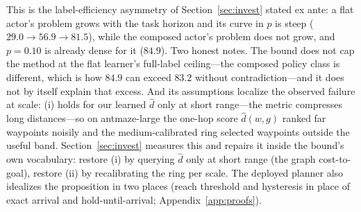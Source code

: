 \documentclass{article}
\theoremstyle{plain}
\theoremstyle{definition}
\begin{document}
This is the label-efficiency asymmetry of Section~\ref{sec:invest} stated ex ante: a flat actor's problem grows with the task horizon and its curve in $p$ is steep ($29.0\rightarrow56.9\rightarrow81.5$), while the composed actor's problem does not grow, and $p{=}0.10$ is already dense for it ($84.9$). Two honest notes. The bound does not cap the method at the flat learner's full-label ceiling---the composed policy class is different, which is how $84.9$ can exceed $83.2$ without contradiction---and it does not by itself explain that excess. And its assumptions localize the observed failure at scale: (i) holds for our learned $\hat d$ only at short range---the metric compresses long distances---so on antmaze-large the one-hop score $\hat d(w,g)$ ranked far waypoints noisily and the medium-calibrated ring selected waypoints outside the useful band. Section~\ref{sec:invest} measures this and repairs it inside the bound's own vocabulary: restore (i) by querying $\hat d$ only at short range (the graph cost-to-goal), restore (ii) by recalibrating the ring per scale. The deployed planner also idealizes the proposition in two places (reach threshold and hysteresis in place of exact arrival and hold-until-arrival; Appendix~\ref{app:proofs}).
\end{document}

